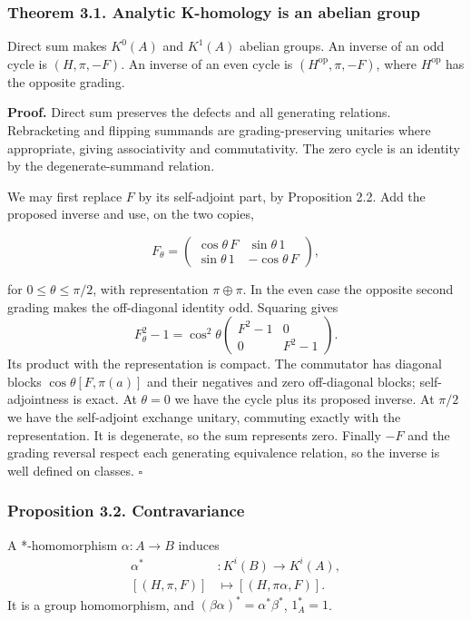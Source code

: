 \documentclass[
  11pt,
]{article}
\begin{document}
\subsubsection{Theorem 3.1. Analytic K-homology is an abelian
group}\label{theorem-3.1.-analytic-k-homology-is-an-abelian-group}

Direct sum makes \(K^0(A)\) and \(K^1(A)\) abelian groups. An inverse of
an odd cycle is \((H,\pi,-F)\). An inverse of an even cycle is
\((H^{\mathrm{op}},\pi,-F)\), where \(H^{\mathrm{op}}\) has the opposite
grading.

\textbf{Proof.} Direct sum preserves the defects and all generating
relations. Rebracketing and flipping summands are grading-preserving
unitaries where appropriate, giving associativity and commutativity. The
zero cycle is an identity by the degenerate-summand relation.

We may first replace \(F\) by its self-adjoint part, by Proposition 2.2.
Add the proposed inverse and use, on the two copies,

\[
F_\theta=
\begin{pmatrix}
\cos\theta\,F&\sin\theta\,1\\
\sin\theta\,1&-\cos\theta\,F
\end{pmatrix},
\tag{3.1}
\]

for \(0\leq\theta\leq\pi/2\), with representation \(\pi\oplus\pi\). In
the even case the opposite second grading makes the off-diagonal
identity odd. Squaring gives \[
F_\theta^2-1
=\cos^2\theta
\begin{pmatrix}F^2-1&0\\0&F^2-1\end{pmatrix}.
\] Its product with the representation is compact. The commutator has
diagonal blocks \(\cos\theta[F,\pi(a)]\) and their negatives and zero
off-diagonal blocks; self-adjointness is exact. At \(\theta=0\) we have
the cycle plus its proposed inverse. At \(\pi/2\) we have the
self-adjoint exchange unitary, commuting exactly with the
representation. It is degenerate, so the sum represents zero. Finally
\(-F\) and the grading reversal respect each generating equivalence
relation, so the inverse is well defined on classes. \(\square\)

\subsubsection{Proposition 3.2.
Contravariance}\label{proposition-3.2.-contravariance}

A *-homomorphism \(\alpha:A\to B\) induces \[
\begin{aligned}
\alpha^*&:K^i(B)\longrightarrow K^i(A),\\
[(H,\pi,F)]&\longmapsto[(H,\pi\alpha,F)].
\end{aligned}
\] It is a group homomorphism, and \((\beta\alpha)^*=\alpha^*\beta^*\),
\(1_A^*=1\).
\end{document}
